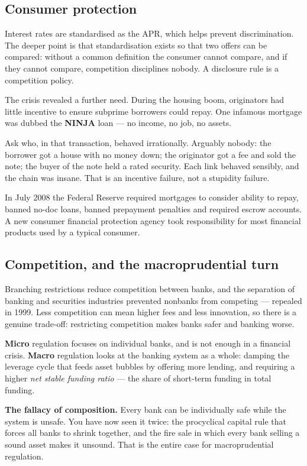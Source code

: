 \documentclass[11pt,a4paper]{article}
\newcommand{\keylab}[1]{\textcolor{ifclay}{\textbf{#1}}}
\begin{document}
\subsection*{Consumer protection}

Interest rates are standardised as the APR, which helps prevent discrimination.
The deeper point is that standardisation exists so that two offers can be
compared: without a common definition the consumer cannot compare, and if they
cannot compare, competition disciplines nobody. A disclosure rule is a
competition policy.

The crisis revealed a further need. During the housing boom, originators had
little incentive to ensure subprime borrowers could repay. One infamous mortgage
was dubbed the \textbf{NINJA} loan --- no income, no job, no assets.

Ask who, in that transaction, behaved irrationally. Arguably nobody: the
borrower got a house with no money down; the originator got a fee and sold the
note; the buyer of the note held a rated security. Each link behaved sensibly,
and the chain was insane. That is an incentive failure, not a stupidity failure.

In July 2008 the Federal Reserve required mortgages to consider ability to
repay, banned no-doc loans, banned prepayment penalties and required escrow
accounts. A new consumer financial protection agency took responsibility for
most financial products used by a typical consumer.

\subsection*{Competition, and the macroprudential turn}

Branching restrictions reduce competition between banks, and the separation of
banking and securities industries prevented nonbanks from competing --- repealed
in 1999. Less competition can mean higher fees and less innovation, so there is
a genuine trade-off: restricting competition makes banks safer and banking
worse.

\textbf{Micro} regulation focuses on individual banks, and is not enough in a
financial crisis. \textbf{Macro} regulation looks at the banking system as a
whole: damping the leverage cycle that feeds asset bubbles by offering more
lending, and requiring a higher \emph{net stable funding ratio} --- the share of
short-term funding in total funding.

\begin{keybox}
\keylab{The fallacy of composition.} Every bank can be individually safe while
the system is unsafe. You have now seen it twice: the procyclical capital rule
that forces all banks to shrink together, and the fire sale in which every bank
selling a sound asset makes it unsound. That is the entire case for
macroprudential regulation.
\end{keybox}
\end{document}
